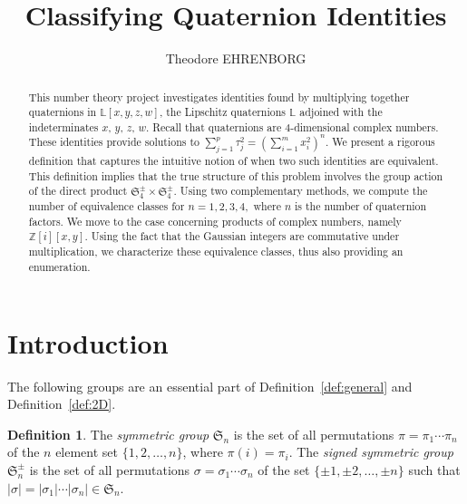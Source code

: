 \documentclass[12pt]{article}
\theoremstyle{definition}
\newtheorem{definition}[theorem]{Definition}
\newcommand{\Zzz}{\mathbb Z}
\newcommand{\Lll}{\mathbb L}
\numberwithin{equation}{section}
\begin{document}


\title{Classifying Quaternion Identities}


\author{\sc Theodore EHRENBORG%
}



\date{}

\maketitle



\begin{abstract}
This number theory project investigates identities found by
multiplying together quaternions in \( \Lll[x,y,z,w] \), the
Lipschitz quaternions \( \Lll \) adjoined with the
indeterminates \(x\), \(y\), \(z\), \(w\).  Recall that quaternions
are \(4\)-dimensional complex numbers.  These identities provide
solutions to \( \sum_{j = 1}^{p} \tau_j ^ 2 = \left( \sum_{i = 1}^{m}
x_i ^ 2 \right) ^ n \). We present a rigorous definition that captures
the intuitive notion of when two such identities are equivalent. This
definition implies that the true structure of this problem involves the
group action of the direct product \( \mathfrak{S}_4^\pm \times \mathfrak{S}_4^\pm \).  Using
two complementary methods, we compute the number of equivalence
classes for \(n = 1, 2, 3, 4,\) where \(n\) is the number of
quaternion factors. We move to the case concerning products of complex
numbers, namely \( \Zzz[i][x,y] \). Using the fact that the
Gaussian integers are commutative under multiplication, we
characterize these equivalence classes, thus also providing an
enumeration.


\end{abstract}





\section{Introduction}
\Huge





The following groups are an essential part of Definition~\ref{def:general}
and Definition~\ref{def:2D}.
\begin{definition}
The {\em symmetric group} \( \mathfrak{S}_n \) is the 
set of all permutations \( \pi = \pi_1 \cdots \pi_n \) 
of the \( n \) element set \( \{ 1, 2, \ldots, n \} \),
where \( \pi(i) = \pi_i \).
The {\em signed symmetric group} \( \mathfrak{S}_n^\pm \)
is the set of all permutations \( \sigma = \sigma_1 \cdots \sigma_n\)
of the set \( \{ \pm 1, \pm 2, \ldots, \pm n \} \) such that
\( | \sigma | = | \sigma_1 | \cdots |\sigma_n| \in \mathfrak{S}_n \).
\end{definition}
\end{document}
